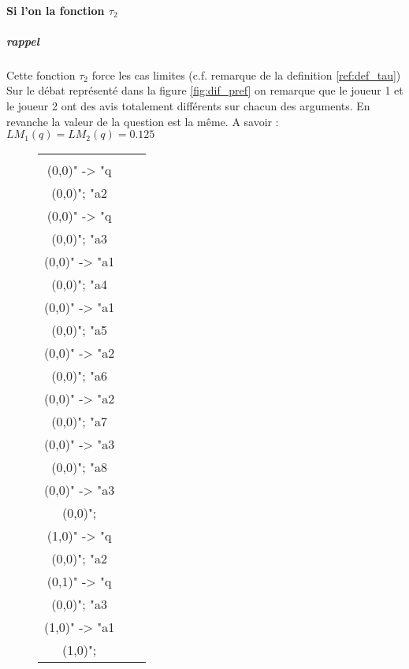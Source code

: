 \documentclass[12pt]{article}
\theoremstyle{defi}
\theoremstyle{not}
\theoremstyle{prob}
\begin{document}
        \paragraph{Si l'on la fonction $\tau_2$}

          \subparagraph{rappel} Cette fonction $\tau_2$ force les cas limites (c.f. remarque de la definition \ref{ref:def_tau}) \\

          Sur le débat représenté dans la figure \ref{fig:dif_pref} on remarque que le joueur 1 et le joueur 2 ont des avis totalement différents sur chacun des arguments. En revanche la valeur de la question est la même. A savoir : $LM_1(q) = LM_2(q) = 0.125$

          \begin{figure}
            \centering
            \begin{tabular}{ccc}
              \begin{tikzpicture}[>=stealth]
              \graph [ layered layout, nodes = {scale=0.75, align=center} ] {
              "a1\\ (0,0)" -> "q\\ (0,0)";
              "a2\\ (0,0)" -> "q\\ (0,0)";
              "a3\\ (0,0)" -> "a1\\ (0,0)";
              "a4\\ (0,0)" -> "a1\\ (0,0)";
              "a5\\ (0,0)" -> "a2\\ (0,0)";
              "a6\\ (0,0)" -> "a2\\ (0,0)";
              "a7\\ (0,0)" -> "a3\\ (0,0)";
              "a8\\ (0,0)" -> "a3\\ (0,0)";
              };
              \end{tikzpicture} &
              \begin{tikzpicture}[>=stealth]
              \graph [ layered layout, nodes = {scale=0.75, align=center} ] {
              "a1\\ (1,0)" -> "q\\ (0,0)";
              "a2\\ (0,1)" -> "q\\ (0,0)";
              "a3\\ (1,0)" -> "a1\\ (1,0)";
}
\end{tikzpicture}
\end{tabular}
\end{figure}
\end{document}
